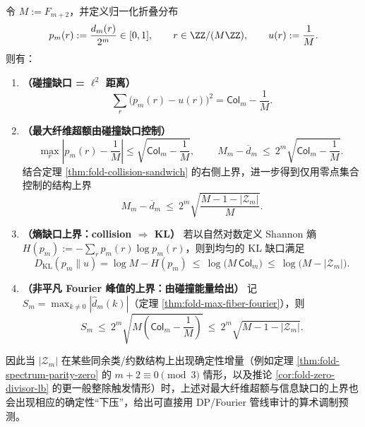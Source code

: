 \begin{theorem}\label{thm:fold-zero-uncertainty}
令 \(M:=F_{m+2}\)，并定义归一化折叠分布
\[
p_m(r):=\frac{d_m(r)}{2^m}\in[0,1],\qquad r\in\ZZ/(M\ZZ),
\qquad
u(r):=\frac{1}{M}.
\]
则有：
\begin{enumerate}
  \item \textbf{（碰撞缺口 = \(\ell^2\) 距离）}
  \[
  \boxed{\;\sum_{r}\bigl(p_m(r)-u(r)\bigr)^2=\mathsf{Col}_m-\frac{1}{M}.\;}
  \]
  \item \textbf{（最大纤维超额由碰撞缺口控制）}
  \[
  \max_r\left|p_m(r)-\frac1M\right|
  \le \sqrt{\mathsf{Col}_m-\frac{1}{M}},
  \qquad
  \boxed{\;
  M_m-\overline d_m\ \le\ 2^m\sqrt{\mathsf{Col}_m-\frac{1}{M}}.\;}
  \]
  结合定理 \ref{thm:fold-collision-sandwich} 的右侧上界，进一步得到仅用零点集合控制的结构上界
  \[
  \boxed{\;
  M_m-\overline d_m\ \le\ 2^m\sqrt{\frac{M-1-|\mathcal{Z}_m|}{M}}. \;}
  \]
  \item \textbf{（熵缺口上界：collision \(\Rightarrow\) KL）}
  若以自然对数定义 Shannon 熵 \(H(p_m):=-\sum_r p_m(r)\log p_m(r)\)，则到均匀的 KL 缺口满足
  \[
  D_{\mathrm{KL}}(p_m\|u)=\log M-H(p_m)\ \le\ \log\!\bigl(M\,\mathsf{Col}_m\bigr)\ \le\ \log\!\bigl(M-|\mathcal{Z}_m|\bigr).
  \]
  \item \textbf{（非平凡 Fourier 峰值的上界：由碰撞能量给出）}
  记 \(S_m=\max_{k\ne 0}|\widehat d_m(k)|\)（定理 \ref{thm:fold-max-fiber-fourier}），则
  \[
  \boxed{\;
  S_m\ \le\ 2^m\sqrt{M\left(\mathsf{Col}_m-\frac{1}{M}\right)}\ \le\ 2^m\sqrt{M-1-|\mathcal{Z}_m|}. \;}
  \]
\end{enumerate}
因此当 \(|\mathcal{Z}_m|\) 在某些同余类/约数结构上出现确定性增量（例如定理 \ref{thm:fold-spectrum-parity-zero} 的 \(m+2\equiv 0\pmod 3\) 情形，以及推论 \ref{cor:fold-zero-divisor-lb} 的更一般整除触发情形）时，上述对最大纤维超额与信息缺口的上界也会出现相应的确定性“下压”，给出可直接用 DP/Fourier 管线审计的算术调制预测。
\end{theorem}
